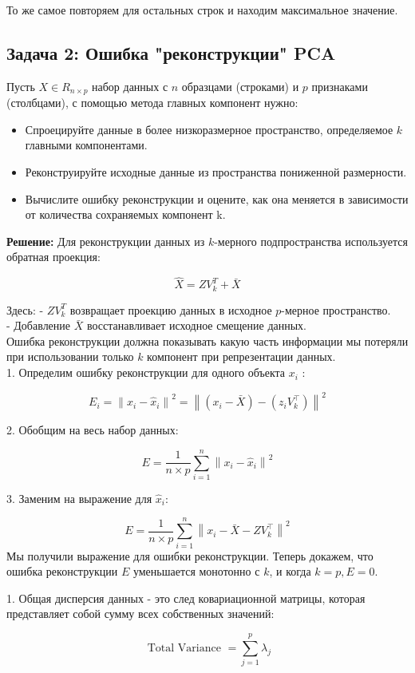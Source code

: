 То же самое повторяем для остальных строк и находим максимальное значение.
\subsection{Задача 2: Ошибка "реконструкции" PCA}
Пусть $X \in R_{n\times p}$ набор данных с $n$ образцами (строками) и $p$ признаками (столбцами), с помощью метода главных компонент нужно:
\begin{itemize}
\item{Спроецируйте данные в более низкоразмерное пространство, определяемое $k$ главными компонентами.}
\item {Реконструируйте исходные данные из пространства пониженной размерности.}
\item {Вычислите ошибку реконструкции и оцените, как она меняется в зависимости от количества сохраняемых компонент k.}
\end{itemize}
\textbf{Решение:}
Для реконструкции данных из $k$-мерного подпространства используется обратная проекция:

$$
\hat{X}=Z V_k^T+\bar{X}
$$


Здесь:
- $Z V_k^T$ возвращает проекцию данных в исходное $p$-мерное пространство.\\
- Добавление $\bar{X}$ восстанавливает исходное смещение данных. \\
Ошибка реконструкции должна показывать какую часть информации мы потеряли при использовании только $k$ компонент при репрезентации данных.\\
1. Определим ошибку реконструкции для одного объекта $x_i$ :

$$
E_i=\left\|x_i-\hat{x}_i\right\|^2=\left\|\left(x_i-\bar{X}\right)-\left(z_i V_k^{\top}\right)\right\|^2
$$

2. Обобщим на весь набор данных:

$$
E=\frac{1}{n \times p} \sum_{i=1}^n\left\|x_i-\hat{x}_i\right\|^2
$$

3. Заменим на выражение для $\hat{x}_i$:

$$
E=\frac{1}{n \times p} \sum_{i=1}^n\left\|x_i-\bar{X}-Z V_k^{\top}\right\|^2
$$
Мы получили выражение для ошибки реконструкции. Теперь докажем, что 
ошибка реконструкции $E$ уменьшается монотонно с $k$, и когда $k=p, E=0$.

1. Общая дисперсия данных - это след ковариационной матрицы, которая представляет собой сумму всех собственных значений:

$$
\text { Total Variance }=\sum_{j=1}^p \lambda_j
$$

